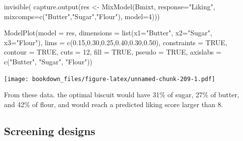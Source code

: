 \documentclass[
]{krantz}
\makeatletter
\newenvironment{Shaded}{\begin{snugshade}}{\end{snugshade}}
\newcommand{\AttributeTok}[1]{\textcolor[rgb]{0.61,0.61,0.61}{#1}}
\newcommand{\ConstantTok}[1]{\textcolor[rgb]{0,0,0}{#1}}
\newcommand{\DecValTok}[1]{\textcolor[rgb]{0.06,0.06,0.06}{#1}}
\newcommand{\FloatTok}[1]{\textcolor[rgb]{0.06,0.06,0.06}{#1}}
\newcommand{\FunctionTok}[1]{\textcolor[rgb]{0,0,0}{#1}}
\newcommand{\NormalTok}[1]{#1}
\newcommand{\OtherTok}[1]{\textcolor[rgb]{0.37,0.37,0.37}{#1}}
\newcommand{\StringTok}[1]{\textcolor[rgb]{0.5,0.5,0.5}{#1}}
\newenvironment{kframe}{%
\medskip{}
\setlength{\fboxsep}{.8em}
 \def\at@end@of@kframe{}%
 \ifinner\ifhmode%
  \def\at@end@of@kframe{\end{minipage}}%
  \begin{minipage}{\columnwidth}%
 \fi\fi%
 \def\FrameCommand##1{\hskip\@totalleftmargin \hskip-\fboxsep
 \colorbox{shadecolor}{##1}\hskip-\fboxsep
     \hskip-\linewidth \hskip-\@totalleftmargin \hskip\columnwidth}%
 \MakeFramed {\advance\hsize-\width
   \@totalleftmargin\z@ \linewidth\hsize
   \@setminipage}}%
 {\par\unskip\endMakeFramed%
 \at@end@of@kframe}
\renewenvironment{Shaded}{\begin{kframe}}{\end{kframe}}
\makeatother
\begin{document}
\begin{Shaded}
\begin{Highlighting}[]
\FunctionTok{invisible}\NormalTok{(}
  \FunctionTok{capture.output}\NormalTok{(res }\OtherTok{\textless{}{-}} \FunctionTok{MixModel}\NormalTok{(Bmixt, }\AttributeTok{response=}\StringTok{"Liking"}\NormalTok{, }
                                 \AttributeTok{mixcomps=}\FunctionTok{c}\NormalTok{(}\StringTok{"Butter"}\NormalTok{,}\StringTok{"Sugar"}\NormalTok{,}\StringTok{"Flour"}\NormalTok{), }
                                 \AttributeTok{model=}\DecValTok{4}\NormalTok{)))}

\FunctionTok{ModelPlot}\NormalTok{(}\AttributeTok{model =}\NormalTok{ res,}
          \AttributeTok{dimensions =} \FunctionTok{list}\NormalTok{(}\AttributeTok{x1=}\StringTok{"Butter"}\NormalTok{, }\AttributeTok{x2=}\StringTok{"Sugar"}\NormalTok{, }\AttributeTok{x3=}\StringTok{"Flour"}\NormalTok{),}
          \AttributeTok{lims =} \FunctionTok{c}\NormalTok{(}\FloatTok{0.15}\NormalTok{,}\FloatTok{0.30}\NormalTok{,}\FloatTok{0.25}\NormalTok{,}\FloatTok{0.40}\NormalTok{,}\FloatTok{0.30}\NormalTok{,}\FloatTok{0.50}\NormalTok{), }\AttributeTok{constraints =} \ConstantTok{TRUE}\NormalTok{,}
          \AttributeTok{contour =} \ConstantTok{TRUE}\NormalTok{, }\AttributeTok{cuts =} \DecValTok{12}\NormalTok{, }\AttributeTok{fill =} \ConstantTok{TRUE}\NormalTok{, }\AttributeTok{pseudo =} \ConstantTok{TRUE}\NormalTok{,}
          \AttributeTok{axislabs =} \FunctionTok{c}\NormalTok{(}\StringTok{"Butter"}\NormalTok{, }\StringTok{"Sugar"}\NormalTok{, }\StringTok{"Flour"}\NormalTok{))}
\end{Highlighting}
\end{Shaded}

\texttt{[image: bookdown\_files/figure-latex/unnamed-chunk-209-1.pdf]}

From these data. the optimal biscuit would have 31\% of sugar, 27\% of butter, and 42\% of flour, and would reach a predicted liking score larger than 8.

\hypertarget{screening-designs}{%
\subsection{Screening designs}\label{screening-designs}}
\end{document}
